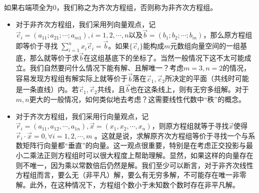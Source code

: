 \documentclass[hyperref,]{ctexart}
\begin{document}
如果右端项全为0，我们称之为齐次方程组，否则称为非齐次方程组。

\begin{itemize}
\item
  对于非齐次方程组，我们采用列向量观点，记\(\vec{c}_i=(a_{11};a_{21};\cdots;a_{m1}),i=1,2,\cdots,n\)以及\(\vec{b}=(b_1;b_2;\cdots;b_m)\)，那么原方程组即等价于寻找
  \(\sum_{i=1}^n x_i\vec{c}_i= \vec{b}\)。如果\(\{\vec{c}_i\}\)能构成\(m\)元数组向量空间的一组基底，那么就等价于求\(\vec{b}\)在这组基底下的坐标了。当然一般情况下这不太可能成立。我们自然要问什么情况下能有解、且解唯一？考虑\(m=3,n=2\)的情况，容易发现方程组有解实际上就等价于\(\vec{b}\)落在\(\vec{c}_1,\vec{c}_2\)所决定的平面（共线时可能是一条直线）内。若\(\vec{c}_1,\vec{c}_2\)共线，且\(\vec{b}\)也在这条线上，则有无穷多组解。对于\(m,n\)更大的一般情况，如何类似地去考虑？这需要线性代数中``秩''的概念。
\item
  对于齐次方程组，我们采用行向量观点，记\(\vec{r}_i = (a_{11},a_{12},\cdots,a_{1n}), \vec{x}=(x_1,x_2,\cdots,x_n)\)，则原方程组就等于寻找\(\vec{x}\)使得\(\vec{r}_i\cdot\vec{x}=0,\forall i=1,2,\cdots,m\)
  。这就是说，求解原齐次方程组等价于寻找一个与系数矩阵行向量都``垂直''的向量。这一观点很重要，特别是在考虑正交投影与最小二乘法正则方程组时可以很大程度上帮助理解。显然，如果这样的向量存在则不唯一，因为乘以常数倍后仍然是解。我们至少可以断言，对于非齐次线性方程组而言，要么无（非平凡）解，要么有无穷多解，不可能存在唯一非零解。此外，在这种情况下，方程组个数小于未知数个数时存在非平凡解。
\end{itemize}
\end{document}
